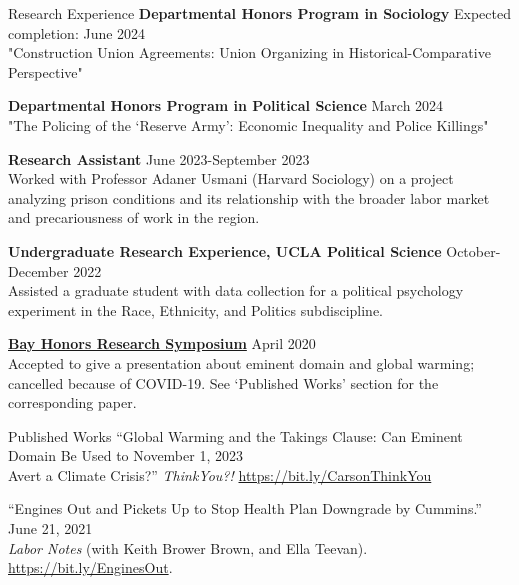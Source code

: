 \documentclass[
	11pt, %
]{resume} %
\begin{document}
\begin{samepage}
\begin{rSection}{Research Experience}
\textbf{Departmental Honors Program in Sociology} \hfill Expected completion: June 2024\\
"Construction Union Agreements: Union Organizing in Historical-Comparative Perspective"

\textbf{Departmental Honors Program in Political Science} \hfill March 2024\\
"The Policing of the `Reserve Army': Economic Inequality and Police Killings"

\textbf{Research Assistant} \hfill June 2023-September 2023\\
Worked with Professor Adaner Usmani (Harvard Sociology) on a project analyzing prison conditions and its
relationship with the broader labor market and precariousness of work in the region.

\textbf{Undergraduate Research Experience, UCLA Political Science} \hfill October-December 2022\\
Assisted a graduate student with data collection for a political psychology experiment in the Race, Ethnicity, and Politics subdiscipline.

\href{https://bayhonors.org/}{\textbf{Bay Honors Research Symposium}} \hfill April 2020\\
Accepted to give a presentation about eminent domain and global warming; cancelled because
of COVID-19. See ‘Published Works’ section for the corresponding paper.

\end{rSection}
\end{samepage}
\begin{samepage}
\begin{rSection}{Published Works}
“Global Warming and the Takings Clause: Can Eminent Domain Be Used to \hfill November 1, 2023 \\
Avert a Climate Crisis?” \textit{ThinkYou?!} \href{https://bit.ly/CarsonThinkYou}{https://bit.ly/CarsonThinkYou}

“Engines Out and Pickets Up to Stop Health Plan Downgrade by Cummins.” \hfill June 21, 2021 \\
\textit{Labor Notes} (with Keith Brower Brown, and Ella Teevan). \href{https://bit.ly/EnginesOut}{https://bit.ly/EnginesOut}.

\end{rSection}
\end{samepage}
\end{document}
